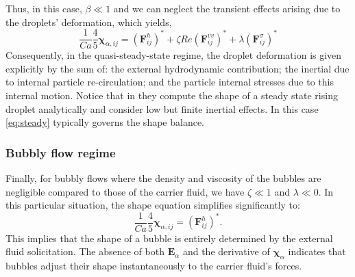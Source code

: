 Thus, in this case, $\beta \ll 1$ and we can neglect the transient effects arising due to the droplets' deformation, which yields, 
\begin{equation}
    \frac{1}{Ca}
    \frac{4  }{5} \bm\chi_{\alpha,ij}
    = (\textbf{F}_{ij}^h)^*
    + \zeta Re (\textbf{F}_{ij}^{vv})^*
    + \lambda (\textbf{F}_{ij}^{\sigma})^*
    \label{eq:steady}
\end{equation}
Consequently, in the quasi-steady-state regime, the droplet deformation is given explicitly by the sum of: the external hydrodynamic contribution; the inertial due to internal particle re-circulation; and the particle internal stresses due to this internal motion. 
Notice that in \citet{taylor1964deformation} they compute the shape of a steady state rising droplet analytically and consider low but finite inertial effects. 
In this case \ref{eq:steady} typically governs the shape balance.
 

\subsubsection{Bubbly flow regime}
Finally, for bubbly flows where the density and viscosity of the bubbles are negligible compared to those of the carrier fluid, we have $\zeta \ll 1$ and $\lambda \ll 0$. 
In this particular situation, the shape equation simplifies significantly to:
\begin{equation}
    \frac{1}{Ca}
    \frac{4  }{5} \bm\chi_{\alpha,ij}
    = (\textbf{F}_{ij}^h)^*. 
    \label{eq:bubbles}
\end{equation}
This implies that the shape of a bubble is entirely determined by the external fluid solicitation. 
The absence of both $\textbf{E}_\alpha$ and the derivative of $\bm\chi_\alpha$ indicates that bubbles adjust their shape instantaneously to the carrier fluid’s forces.

